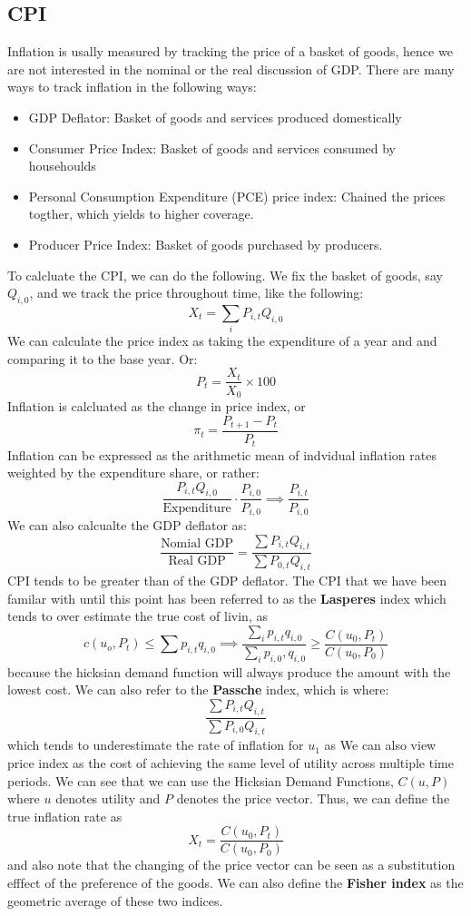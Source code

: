 \documentclass[11pt]{article}
\begin{document}
\subsection{CPI}
Inflation is usally measured by tracking the price of a basket of goods, hence we are not interested in the nominal or the real discussion of GDP. There are many ways to track inflation in the following ways:
\begin{itemize}
    \item GDP Deflator: Basket of goods and services produced domestically
    \item Consumer Price Index: Basket of goods and services consumed by househoulds
    \item Personal Consumption Expenditure (PCE) price index: Chained the prices togther, which yields to higher coverage. 
    \item Producer Price Index: Basket of goods purchased by producers. 
\end{itemize}
To calcluate the CPI, we can do the following. We fix the basket of goods, say $Q_{i,0}$, and we track the price throughout time, like the following:
\[
X_t = \sum_i P_{i, t} Q_{i,0}
\]
We can calculate the price index as taking the expenditure of a year and and comparing it to the base year. Or: 
\[
P_t = \frac{X_t}{X_0} \times 100
\]
Inflation is calcluated as the change in price index, or
\[
\pi_t = \frac{P_{t+1} - P_t}{P_t}
\]
Inflation can be expressed as the arithmetic mean of indvidual inflation rates weighted by the expenditure share, or rather:
\[
\frac{P_{i,t} Q_{i,0}}{\text{Expenditure}} \cdot \frac{P_{i,0}}{P_{i,0}} \implies \frac{P_{i,t}}{P_{i,0}}
\]
We can also calcualte the GDP deflator as:
\[
\frac{\text{Nomial GDP}}{\text{Real GDP}} = \frac{\sum P_{i,t}Q_{i,t}}{\sum P_{0,t}Q_{i,t}}
\]
CPI tends to be greater than of the GDP deflator. The CPI that we have been familar with until this point has been referred to as the \textbf{Lasperes} index which tends to over estimate the true cost of livin, as 
\[
c(u_o, P_t) \leq \sum p_{i,t} q_{i,0} \implies \frac{\sum_i p_{i,t}q_{i,0}}{\sum_i p_{i,0}, q_{i,0}} \geq \frac{C(u_0, P_t)}{C(u_0, P_0)}
\]
because the hicksian demand function will always produce the amount with the lowest cost. 
We can also refer to the \textbf{Passche} index, which is where:
\[
\frac{\sum P_{i,t} Q_{i,t}}{\sum P_{i,0} Q_{i,t}}
\]
which tends to underestimate the rate of inflation for $u_1$ as 
We can also view price index as the cost of achieving the same level of utility across multiple time periods. We can see that we can use the Hicksian Demand Functions, $C(u,P)$ where $u$ denotes utility and $P$ denotes the price vector. Thus, we can define the true inflation rate as 
\[
X_t = \frac{C(u_0, P_t)}{C(u_0, P_0)}
\]
and also note that the changing of the price vector can be seen as a substitution efffect of the preference of the goods. We can also define the \textbf{Fisher index} as the geometric average of these two indices.
\end{document}
